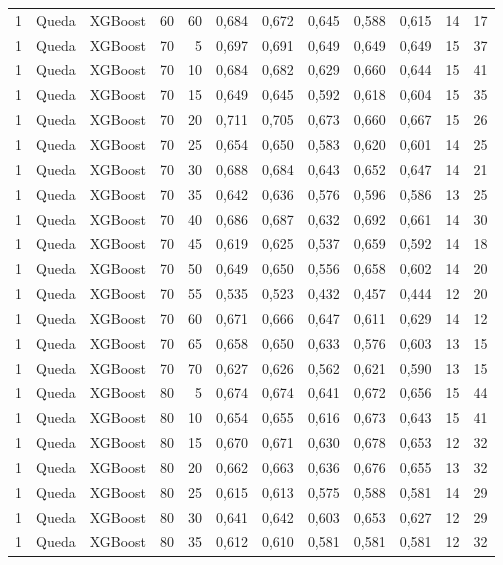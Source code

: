 \begin{longtable}{@{}rllrrrrrrrrr@{}}
1 & Queda & XGBoost & 60 & 60 & 0,684 & 0,672 & 0,645 & 0,588 & 0,615 & 14 & 17 \\
1 & Queda & XGBoost & 70 & 5 & 0,697 & 0,691 & 0,649 & 0,649 & 0,649 & 15 & 37 \\
1 & Queda & XGBoost & 70 & 10 & 0,684 & 0,682 & 0,629 & 0,660 & 0,644 & 15 & 41 \\
1 & Queda & XGBoost & 70 & 15 & 0,649 & 0,645 & 0,592 & 0,618 & 0,604 & 15 & 35 \\
1 & Queda & XGBoost & 70 & 20 & 0,711 & 0,705 & 0,673 & 0,660 & 0,667 & 15 & 26 \\
1 & Queda & XGBoost & 70 & 25 & 0,654 & 0,650 & 0,583 & 0,620 & 0,601 & 14 & 25 \\
1 & Queda & XGBoost & 70 & 30 & 0,688 & 0,684 & 0,643 & 0,652 & 0,647 & 14 & 21 \\
1 & Queda & XGBoost & 70 & 35 & 0,642 & 0,636 & 0,576 & 0,596 & 0,586 & 13 & 25 \\
1 & Queda & XGBoost & 70 & 40 & 0,686 & 0,687 & 0,632 & 0,692 & 0,661 & 14 & 30 \\
1 & Queda & XGBoost & 70 & 45 & 0,619 & 0,625 & 0,537 & 0,659 & 0,592 & 14 & 18 \\
1 & Queda & XGBoost & 70 & 50 & 0,649 & 0,650 & 0,556 & 0,658 & 0,602 & 14 & 20 \\
1 & Queda & XGBoost & 70 & 55 & 0,535 & 0,523 & 0,432 & 0,457 & 0,444 & 12 & 20 \\
1 & Queda & XGBoost & 70 & 60 & 0,671 & 0,666 & 0,647 & 0,611 & 0,629 & 14 & 12 \\
1 & Queda & XGBoost & 70 & 65 & 0,658 & 0,650 & 0,633 & 0,576 & 0,603 & 13 & 15 \\
1 & Queda & XGBoost & 70 & 70 & 0,627 & 0,626 & 0,562 & 0,621 & 0,590 & 13 & 15 \\
1 & Queda & XGBoost & 80 & 5 & 0,674 & 0,674 & 0,641 & 0,672 & 0,656 & 15 & 44 \\
1 & Queda & XGBoost & 80 & 10 & 0,654 & 0,655 & 0,616 & 0,673 & 0,643 & 15 & 41 \\
1 & Queda & XGBoost & 80 & 15 & 0,670 & 0,671 & 0,630 & 0,678 & 0,653 & 12 & 32 \\
1 & Queda & XGBoost & 80 & 20 & 0,662 & 0,663 & 0,636 & 0,676 & 0,655 & 13 & 32 \\
1 & Queda & XGBoost & 80 & 25 & 0,615 & 0,613 & 0,575 & 0,588 & 0,581 & 14 & 29 \\
1 & Queda & XGBoost & 80 & 30 & 0,641 & 0,642 & 0,603 & 0,653 & 0,627 & 12 & 29 \\
1 & Queda & XGBoost & 80 & 35 & 0,612 & 0,610 & 0,581 & 0,581 & 0,581 & 12 & 32 \\

\end{longtable}
